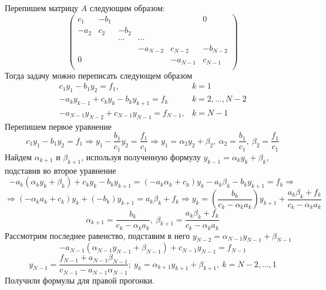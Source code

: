 \documentclass[12pt]{article}
\begin{document}
\begin{enumerate}[I.]
\begin{enumerate}
		            Перепишем матрицу $A$ следующим образом:
		            \[\left(\begin{array}{cccccc}
					            c_1  & -b_1 &        &          &          & 0        \\
					            -a_2 & c_2  & -b_2   &          &          &          \\
					                 &      & \cdots & \cdots   &          &          \\
					                 &      &        & -a_{N-2} & c_{N-2}  & -b_{N-2} \\
					            0    &      &        &          & -a_{N-1} & c_{N-1}  \\
				            \end{array}\right)\]
		            Тогда задачу можно переписать следующем образом
		            \[
			            \begin{array}{cc}
				            c_1y_1-b_1y_2=f_1,                      & k=1            \\
				            -a_ky_{k-1}+c_ky_k-b_ky_{k+1}=f_k       & k=2,\ldots,N-2 \\
				            -a_{N-1}y_{N-2}+c_{N-1}y_{N-1}=f_{N-1}, & k=N-1
			            \end{array}
		            \]
		            Перепишем первое уравнение
		            \[ c_1y_1-b_1y_2=f_1 \Rightarrow y_1-\frac{b_1}{c_1}y_2=\frac{f_1}{c_1}\Rightarrow y_1=\alpha_2y_2+\beta_2,\ \alpha_2=\frac{b_1}{c_1},\ \beta_2=\frac{f_1}{c_1}\]
		            Найдем $\alpha_{k+1}$ и $\beta_{k+1}$, используя полученную формулу $y_{k-1}=\alpha_ky_k+\beta_k$, подставив во второе уравнение
		            \[-a_k(\alpha_ky_k+\beta_k)+c_ky_k-b_ky_{k+1}=(-a_k\alpha_k+c_k)y_k-a_k\beta_k-b_ky_{k+1}=f_k\Rightarrow\]
		            \[\Rightarrow(-\alpha_ka_k+c_k)y_k+(-b_k)y_{k+1}=a_k\beta_k+f_k\Rightarrow y_k=\left(\frac{b_k}{c_k-\alpha_ka_k}\right)y_{k+1}+\frac{a_k\beta_k+f_k}{c_k-\alpha_ka_k}\]
		            \[\alpha_{k+1}=\frac{b_k}{c_k-\alpha_ka_k},\ \beta_{k+1}=\frac{a_k\beta_k+f_k}{c_k-\alpha_ka_k}\]
		            Рассмотрим последнее равенство, подставим в него $y_{N-2}=\alpha_{N-1}y_{N-1}+\beta_{N-1}$
		            \[-a_{N-1}(\alpha_{N-1}y_{N-1}+\beta_{N-1})+c_{N-1}y_{N-1}=f_{N-1}\]
		            \[y_{N-1}=\frac{f_{N-1}+a_{N-1}\beta_{N-1}}{c_{N-1}-a_{N-1}\alpha_{N-1}};\ y_k=\alpha_{k+1}y_{k+1}+\beta_{k+1},\ k=N-2,\ldots,1\]
		            Получили формулы для правой прогонки.
	      \end{enumerate}

	      \newpage


\end{enumerate}
\end{document}
